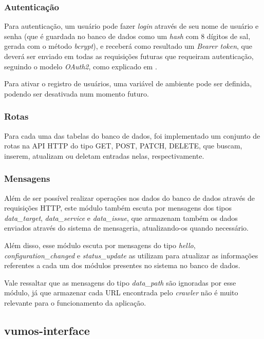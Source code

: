     \subsubsection{Autenticação}
    
    Para autenticação, um usuário pode fazer \textit{login} através de seu nome de usuário e senha (que é guardada no banco de dados como um \textit{hash} com 8 dígitos de sal, gerada com o método \textit{bcrypt}), e receberá como resultado um \textit{Bearer token}, que deverá ser enviado em todas as requisições futuras que requeiram autenticação, seguindo o modelo \textit{OAuth2}, como explicado em \cite{jones2012oauth}.
    
    Para ativar o registro de usuários, uma variável de ambiente pode ser definida, podendo ser desativada num momento futuro.
    
    
    \subsubsection{Rotas}
    
    Para cada uma das tabelas do banco de dados, foi implementado um conjunto de rotas na API HTTP do tipo GET, POST, PATCH, DELETE, que buscam, inserem, atualizam ou deletam entradas nelas, respectivamente.
    
    \subsubsection{Mensagens}
    
    Além de ser possível realizar operações nos dados do banco de dados através de requisições HTTP, este módulo também escuta por mensagens dos tipos \textit{data\_target}, \textit{data\_service} e \textit{data\_issue}, que armazenam também os dados enviados através do sistema de mensageria, atualizando-os quando necessário.
    
    Além disso, esse módulo escuta por mensagens do tipo \textit{hello}, \textit{configuration\_changed} e \textit{status\_update} as utilizam para atualizar as informações referentes a cada um dos módulos presentes no sistema no banco de dados.
    
    Vale ressaltar que as mensagens do tipo \textit{data\_path} são ignoradas por esse módulo, já que armazenar cada URL encontrada pelo \textit{crawler} não é muito relevante para o funcionamento da aplicação.
    

    \subsection{vumos-interface}
    

